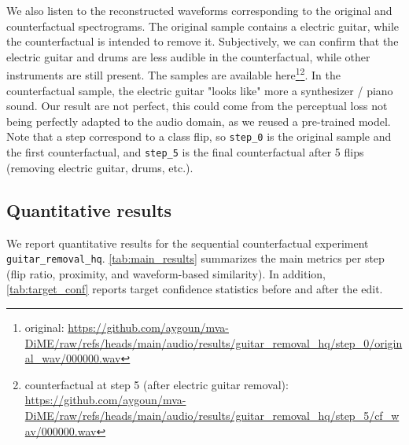 \documentclass[11pt]{article}
\begin{document}
We also listen to the reconstructed waveforms corresponding to the original and
counterfactual spectrograms. The original sample contains a electric
guitar, while the
counterfactual is intended to remove it. Subjectively, we can confirm that the
electric guitar and drums are less audible in the counterfactual,
while other instruments
are still present. The samples are available here\footnote{original:
\url{https://github.com/aygoun/mva-DiME/raw/refs/heads/main/audio/results/guitar_removal_hq/step_0/original_wav/000000.wav}}\footnote{counterfactual
  at step 5 (after electric guitar removal):
\url{https://github.com/aygoun/mva-DiME/raw/refs/heads/main/audio/results/guitar_removal_hq/step_5/cf_wav/000000.wav}}.
In the counterfactual sample, the electric guitar "looks like" more a
synthesizer / piano sound.
Our result are not perfect, this could come from the perceptual loss
not being perfectly adapted to the audio domain, as we reused a
pre-trained model.
Note that a step correspond to a class flip, so \texttt{step\_0} is
the original sample and the first counterfactual, and
\texttt{step\_5} is the final counterfactual
after 5 flips (removing electric guitar, drums, etc.).

\subsection{Quantitative results}

We report quantitative results for the sequential counterfactual experiment
\texttt{guitar\_removal\_hq}. \autoref{tab:main_results} summarizes the main
metrics per step (flip ratio, proximity, and waveform-based similarity). In
addition, \autoref{tab:target_conf} reports target confidence statistics before
and after the edit.

\begin{table}[H]
  \centering
  \caption{Main quantitative results for \texttt{guitar\_removal\_hq}.
    Flip Ratio measures success for the target edit; L1 Prox measures
    spectrogram proximity; MNAC counts non-target label changes.
  SNR and LSD are computed on reconstructed waveforms.}
  \label{tab:main_results}
  
\end{table}

\begin{table}[H]
  \centering
  \caption{Per-step target-class evaluation for \texttt{guitar\_removal\_hq}.
    $P_{\mathrm{tgt}}$ denotes the classifier posterior probability
    for the target
  class before and after counterfactual generation.}
  \label{tab:target_conf}
  
\end{table}
\end{document}
